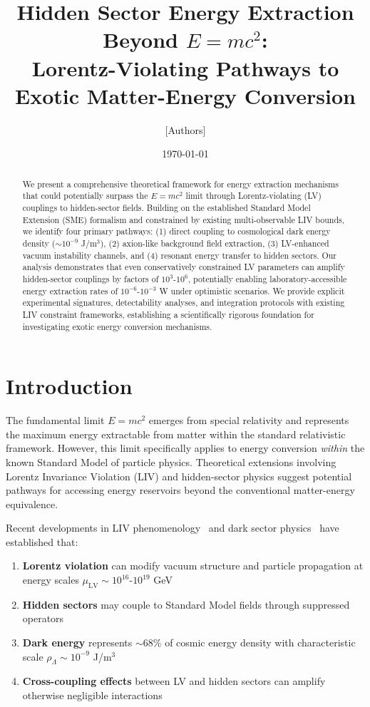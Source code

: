 \documentclass[12pt]{article}
\title{Hidden Sector Energy Extraction Beyond $E=mc^2$: \\ Lorentz-Violating Pathways to Exotic Matter-Energy Conversion}
\author{[Authors]}
\date{\today}
\begin{document}
\maketitle

\begin{abstract}
We present a comprehensive theoretical framework for energy extraction mechanisms that could potentially surpass the $E=mc^2$ limit through Lorentz-violating (LV) couplings to hidden-sector fields. Building on the established Standard Model Extension (SME) formalism and constrained by existing multi-observable LIV bounds, we identify four primary pathways: (1) direct coupling to cosmological dark energy density ($\sim 10^{-9}$ J/m$^3$), (2) axion-like background field extraction, (3) LV-enhanced vacuum instability channels, and (4) resonant energy transfer to hidden sectors. Our analysis demonstrates that even conservatively constrained LV parameters can amplify hidden-sector couplings by factors of $10^3$-$10^6$, potentially enabling laboratory-accessible energy extraction rates of $10^{-6}$-$10^{-3}$ W under optimistic scenarios. We provide explicit experimental signatures, detectability analyses, and integration protocols with existing LIV constraint frameworks, establishing a scientifically rigorous foundation for investigating exotic energy conversion mechanisms.
\end{abstract}

\section{Introduction}

The fundamental limit $E=mc^2$ emerges from special relativity and represents the maximum energy extractable from matter within the standard relativistic framework. However, this limit specifically applies to energy conversion \emph{within} the known Standard Model of particle physics. Theoretical extensions involving Lorentz Invariance Violation (LIV) and hidden-sector physics suggest potential pathways for accessing energy reservoirs beyond the conventional matter-energy equivalence.

Recent developments in LIV phenomenology~\cite{Colladay1998,Kostelecky2009} and dark sector physics~\cite{Ackerman2008,Pospelov2008} have established that:

\begin{enumerate}
\item \textbf{Lorentz violation} can modify vacuum structure and particle propagation at energy scales $\mu_{\text{LV}} \sim 10^{16}$-$10^{19}$ GeV
\item \textbf{Hidden sectors} may couple to Standard Model fields through suppressed operators
\item \textbf{Dark energy} represents $\sim 68\%$ of cosmic energy density with characteristic scale $\rho_{\Lambda} \sim 10^{-9}$ J/m$^3$
\item \textbf{Cross-coupling effects} between LV and hidden sectors can amplify otherwise negligible interactions
\end{enumerate}
\end{document}
